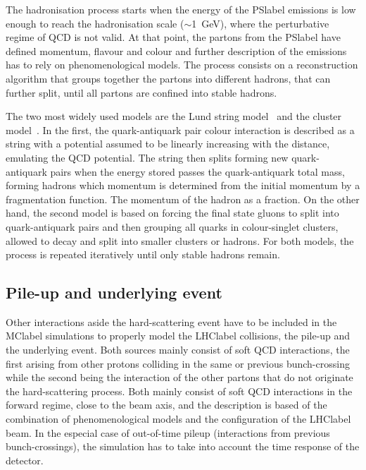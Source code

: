 The hadronisation process starts when the energy of the \acrshort{PSlabel} emissions is low enough to reach the hadronisation scale ($\sim$1~GeV), where the perturbative regime of \acrshort{QCD} is not valid. At that point, the partons from the \acrshort{PSlabel} have defined momentum, flavour and colour and further description of the emissions has to rely on phenomenological models. The process consists on a reconstruction algorithm that groups together the partons into different hadrons, that can further split, until all partons are confined into stable hadrons. 

The two most widely used models are the Lund string model~\cite{ANDERSSON198331} and the cluster model~\cite{Winter2004}.
In the first, the quark-antiquark pair colour interaction is described as a string with a potential assumed to be linearly increasing with the distance, emulating the \acrshort{QCD} potential. The string then splits forming new quark-antiquark pairs when the energy stored passes the quark-antiquark total mass, forming hadrons which momentum is determined from the initial momentum by a fragmentation function. The momentum of the hadron as a fraction. On the other hand, the second model is based on forcing the final state gluons to split into quark-antiquark pairs and then grouping all quarks in colour-singlet clusters, allowed to decay and split into smaller clusters or hadrons. For both models, the process is repeated iteratively until only stable hadrons remain.

\subsection{Pile-up and underlying event}

Other interactions aside the hard-scattering event have to be included in the \acrshort{MClabel} simulations to properly model the \acrshort{LHClabel} collisions, the pile-up and the underlying event. Both sources mainly consist of soft \acrshort{QCD} interactions, the first arising from other protons colliding in the same or previous bunch-crossing while the second being the interaction of the other partons that do not originate the hard-scattering process. Both mainly consist of soft \acrshort{QCD} interactions in the forward regime, close to the beam axis, and the description is based of the combination of phenomenological models and the configuration of the \acrshort{LHClabel} beam. In the especial case of out-of-time pileup (interactions from previous bunch-crossings), the simulation has to take into account the time response of the detector.

